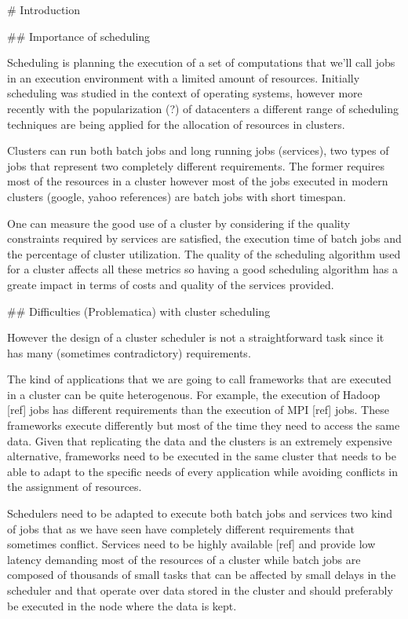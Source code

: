 
# Introduction

## Importance of scheduling

Scheduling is planning the execution of a
set of computations that we'll call jobs in an execution environment
with a limited amount of resources. Initially scheduling was studied
in the context of operating systems, however more recently with the
popularization (?) of datacenters a different range of scheduling
techniques are being applied for the allocation of resources in
clusters. 

Clusters can run both batch jobs and long running jobs (services), two
types of jobs that represent two completely different requirements.
The former requires most of the resources in a cluster however most of
the jobs executed in modern clusters (google, yahoo references) are
batch jobs with short timespan.

One can measure the good use of a cluster by considering if the
quality constraints required by services are satisfied, the execution
time of batch jobs and the percentage of cluster utilization. The
quality of the scheduling algorithm used for a cluster affects all
these metrics so having a good scheduling algorithm has a greate
impact in terms of costs and quality of the services provided.

## Difficulties (Problematica) with cluster scheduling

However the design of a cluster scheduler is not a straightforward
task since it has many (sometimes contradictory) requirements.

The kind of applications that we are going to call frameworks
that are executed in a cluster can be quite
heterogenous. For example, the execution of Hadoop [ref]
jobs has different requirements than the execution of MPI [ref]
jobs. These frameworks execute differently but most of the
time they need to access the same data. Given that replicating the
data and the clusters is an extremely expensive alternative, frameworks
need to be executed in the same cluster that needs to be able to adapt
to the specific needs of every application while avoiding conflicts in
the assignment of resources.

Schedulers need to be adapted to execute both batch jobs and services
two kind of jobs that as we have seen have completely different
requirements that sometimes conflict. Services need to be highly
available [ref] and provide low latency demanding most of the
resources of a cluster while batch jobs are composed of thousands of small
tasks that can be affected by small delays in the scheduler and that
operate over data stored in the cluster and should
preferably be executed in the node where the data is kept.

